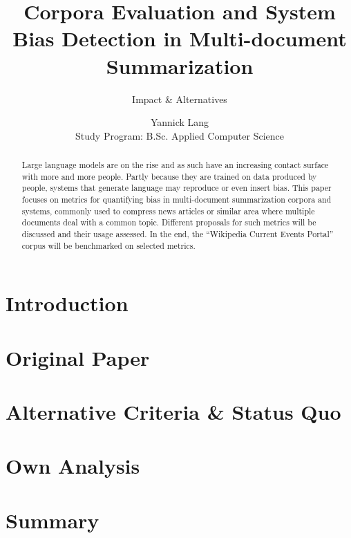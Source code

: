 \documentclass[runningheads]{llncs}
\begin{document}
\title{Corpora Evaluation and System Bias Detection in Multi-document Summarization}
\subtitle{Impact \& Alternatives}
\author{Yannick Lang \\
    \small Study Program: B.Sc. Applied Computer Science }

\maketitle              %


\begin{abstract}
    Large language models are on the rise and as such have an increasing contact surface with more and more people. Partly because they are trained on data produced by people, systems that generate language may reproduce or even insert bias. This paper focuses on metrics for quantifying bias in multi-document summarization corpora and systems, commonly used to compress news articles or similar area where multiple documents deal with a common topic. Different proposals for such metrics will be discussed and their usage assessed. In the end, the \enquote{Wikipedia Current Events Portal} corpus will be benchmarked on selected metrics.
    
\end{abstract}

\section{Introduction}
\label{sec:introcution}


\section{Original Paper}
\label{sec:original-paper}


\section{Alternative Criteria \& Status Quo}
\label{sec:alternative-criteria}


\section{Own Analysis}
\label{sec:analysis}


\section{Summary}
\label{sec:summary}





\end{document}

